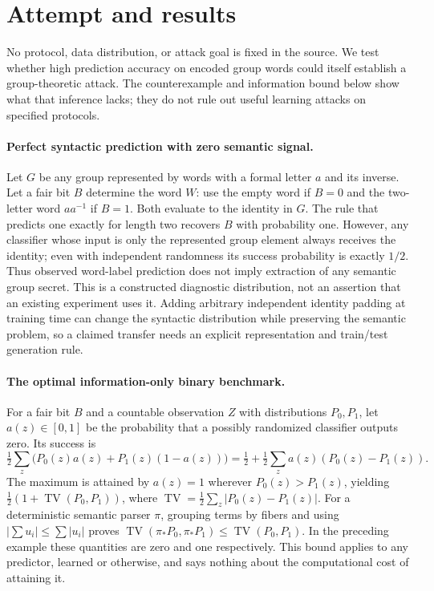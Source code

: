 \documentclass[11pt]{article}
\begin{document}
\section{Attempt and results}
No protocol, data distribution, or attack goal is fixed in the source. We test
whether high prediction accuracy on encoded group words could itself establish
a group-theoretic attack. The counterexample and information bound below show
what that inference lacks; they do not rule out useful learning attacks on
specified protocols.

\paragraph{Perfect syntactic prediction with zero semantic signal.}
Let $G$ be any group represented by words with a formal letter $a$ and its
inverse. Let a fair bit $B$ determine the word $W$: use the empty word if
$B=0$ and the two-letter word $aa^{-1}$ if $B=1$. Both evaluate to the
identity in $G$. The rule that predicts one exactly for length two recovers
$B$ with probability one. However, any classifier whose input is only the
represented group element always receives the identity; even with independent
randomness its success probability is exactly $1/2$.
Thus observed word-label prediction does not imply extraction of any semantic
group secret. This is a constructed diagnostic distribution, not an assertion
that an existing experiment uses it. Adding arbitrary independent identity
padding at training time can change the syntactic distribution while preserving
the semantic problem, so a claimed transfer needs an explicit representation
and train/test generation rule.

\paragraph{The optimal information-only binary benchmark.}
For a fair bit $B$ and a countable observation $Z$ with distributions $P_0,P_1$,
let $a(z)\in[0,1]$ be the probability that a possibly randomized classifier
outputs zero. Its success is
\[
\tfrac12\sum_z\bigl(P_0(z)a(z)+P_1(z)(1-a(z))\bigr)
=\tfrac12+\tfrac12\sum_z a(z)(P_0(z)-P_1(z)).
\]
The maximum is attained by $a(z)=1$ wherever $P_0(z)>P_1(z)$, yielding
$\tfrac12(1+\operatorname{TV}(P_0,P_1))$, where
$\operatorname{TV}=\tfrac12\sum_z|P_0(z)-P_1(z)|$.
For a deterministic semantic parser $\pi$, grouping terms by fibers and
using $|\sum u_i|\le\sum|u_i|$ proves
$\operatorname{TV}(\pi_*P_0,\pi_*P_1)\le\operatorname{TV}(P_0,P_1)$.
In the preceding example these quantities are zero and one respectively.
This bound applies to any predictor, learned or otherwise, and says nothing
about the computational cost of attaining it.
\end{document}
